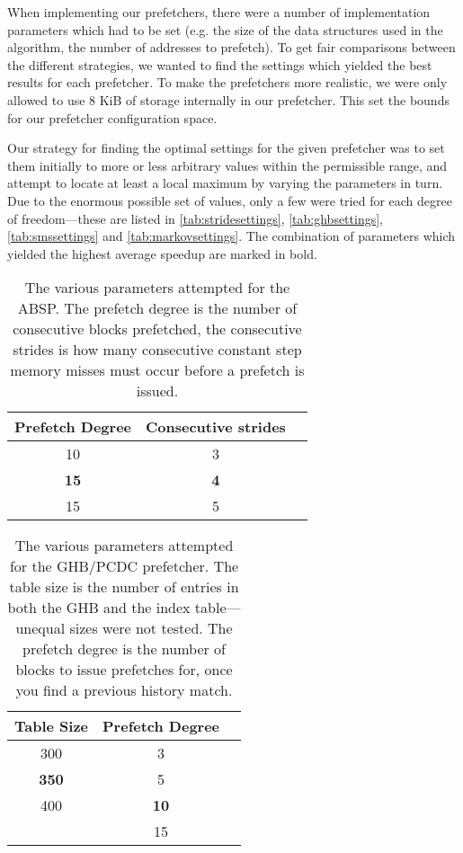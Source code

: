When implementing our prefetchers, there were a number of
implementation parameters which had to be set (e.g. the size of the
data structures used in the algorithm, the number of addresses to
prefetch). To get fair comparisons between the different strategies,
we wanted to find the settings which yielded the best results for each
prefetcher. To make the prefetchers more realistic, we were only
allowed to use 8 KiB of storage internally in our prefetcher. This set
the bounds for our prefetcher configuration space. 

Our strategy for finding the optimal settings for the given prefetcher
was to set them initially to more or less arbitrary values within the
permissible range, and attempt to locate at least a local maximum by
varying the parameters in turn. Due to the enormous possible set of
values, only a few were tried for each degree of freedom---these are
listed in \autoref{tab:stridesettings}, \autoref{tab:ghbsettings},
\autoref{tab:smssettings} and \autoref{tab:markovsettings}. The
combination of parameters which yielded the highest average speedup
are marked in bold.

\begin{table}[htbp]
  \caption{The various parameters attempted for the ABSP. The prefetch degree is the number of consecutive blocks prefetched, the consecutive strides is how many consecutive constant step memory misses must occur before a prefetch is issued.}
  \centering
  \begin{tabular}{|c|c|c|}
    \hline
    \textbf{Prefetch Degree} & \textbf{Consecutive strides} \\ \hline
    10 & 3 \\ \hline
    \textbf{15} & \textbf{4} \\ \hline
    15 & 5 \\ \hline %
  \end{tabular}
  \label{tab:stridesettings}
\end{table}

\begin{table}[htbp]
  \caption{The various parameters attempted for the GHB/PCDC prefetcher. The table size is the number of entries in both the GHB and the index table---unequal sizes were not tested. The prefetch degree is the number of blocks to issue prefetches for, once you find a previous history match.}
  \centering
  \begin{tabular}{|c|c|c|}
    \hline
    \textbf{Table Size} & \textbf{Prefetch Degree} \\ \hline
    300 & 3 \\ \hline
    \textbf{350} & 5 \\ \hline
    400 & \textbf{10} \\ \hline
        & 15 \\ \hline
  \end{tabular}
  \label{tab:ghbsettings}
\end{table}

